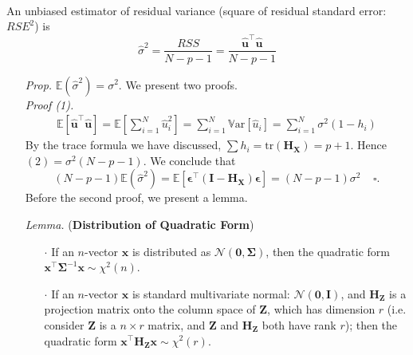 \documentclass[a4paper, 11pt]{article}
\begin{document}
~\\
An unbiased estimator of residual variance (square of residual standard error: $RSE^2$) is
$$
\hat{\sigma}^2 = \frac{RSS}{N-p-1} = \frac{\hat{\bm{u}}^{\top} \hat{\bm{u}}}{N-p-1}
$$
\begin{itemize}
	\item[\textit{Prop.}] $\mathbb{E}(\hat{\sigma}^2) = \sigma^2$. We present two proofs. \\
	\textit{Proof (1).~~} 
	\begin{equation}
		\begin{split}
			\mathbb{E}\left[\hat{\bm{u}}^{\top} \hat{\bm{u}}\right] = \mathbb{E}\left[\sum_{i=1}^N \hat{u}_i^2\right] = \sum_{i=1}^N \mathrm{\mathbb{V}ar}\left[\hat{u}_i\right] = \sum_{i=1}^N \sigma^2(1-h_i)
		\end{split}
	\end{equation}
	By the trace formula we have discussed, $\sum{h_i} = \text{tr}(\bm{H}_{\bm{X}}) = p+1$. Hence $(2)=\sigma^2(N-p-1)$. We conclude that 
	$$
	(N-p-1)\mathbb{E}(\hat{\sigma}^2) = \mathbb{E}\left[\bm{\epsilon}^{\top}(\bm{I}-\bm{H}_{\bm{X}})\bm{\epsilon}\right] = (N-p-1)\sigma^2~~~~~\square.
	$$
	Before the second proof, we present a lemma.
	\item[\textit{Lemma.}] (\textbf{Distribution of Quadratic Form})
	\begin{itemize}
		\item[$\cdot$] If an $n$-vector $\bm{x}$ is distributed as $\mathcal{N}(\bm{0}, \bm{\Sigma})$, then the quadratic form ${\bm{x}}^{\top} \bm{\Sigma}^{-1} {\bm{x}} \sim \chi^2(n)$.
		\item[$\cdot$] If an $n$-vector $\bm{x}$ is standard multivariate normal: $\mathcal{N}(\bm{0}, \bm{I})$, and $\bm{H}_{\bm{Z}}$ is a projection matrix onto the column space of $\bm{Z}$, which has dimension $r$ (i.e. consider $\bm{Z}$ is a $n\times r$ matrix, and $\bm{Z}$ and $\bm{H}_{\bm{Z}}$ both have rank $r$); then the quadratic form $\bm{x}^{\top} \bm{H}_{\bm{Z}} \bm{x}\sim \chi^2(r)$.
	\end{itemize}


\end{itemize}
\end{document}
